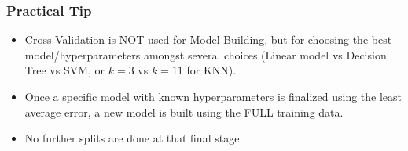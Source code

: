 \begin{frame}[fragile]\frametitle{Practical Tip}
	\begin{itemize}
		\item Cross Validation is NOT used for Model Building, but for choosing the best model/hyperparameters amongst several choices (Linear model vs Decision Tree vs SVM, or $k=3$ vs $k=11$ for KNN).
		\item Once a specific model with known hyperparameters is finalized using the least average error, a new model is built using the FULL training data.
		\item No further splits are done at that final stage.
	\end{itemize}
\end{frame}





